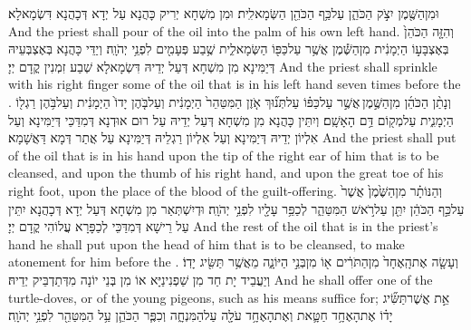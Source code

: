{וּמִן\maqqaf הַשֶּׁ֖מֶן יִצֹ֣ק הַכֹּהֵ֑ן עַל\maqqaf כַּ֥ף הַכֹּהֵ֖ן הַשְּׂמָאלִֽית׃}
{וּמִן מִשְׁחָא יְרִיק כָּהֲנָא עַל יְדָא דְּכָהֲנָא דִּשְׂמָאלָא׃}
{And the priest shall pour of the oil into the palm of his own left hand.}{}
{וְהִזָּ֤ה הַכֹּהֵן֙ בְּאֶצְבָּע֣וֹ הַיְמָנִ֔ית מִן\maqqaf הַשֶּׁ֕מֶן אֲשֶׁ֥ר עַל\maqqaf כַּפּ֖וֹ הַשְּׂמָאלִ֑ית שֶׁ֥בַע פְּעָמִ֖ים לִפְנֵ֥י יְהֹוָֽה׃}
{וְיַדֵּי כָּהֲנָא בְּאֶצְבְּעֵיהּ דְּיַמִּינָא מִן מִשְׁחָא דְּעַל יְדֵיהּ דִּשְׂמָאלָא שְׁבַע זִמְנִין קֳדָם יְיָ׃}
{And the priest shall sprinkle with his right finger some of the oil that is in his left hand seven times before the \lord.}{}
{וְנָתַ֨ן הַכֹּהֵ֜ן מִן\maqqaf הַשֶּׁ֣מֶן \legarmeh  אֲשֶׁ֣ר עַל\maqqaf כַּפּ֗וֹ עַל\maqqaf תְּנ֞וּךְ אֹ֤זֶן הַמִּטַּהֵר֙ הַיְמָנִ֔ית וְעַל\maqqaf בֹּ֤הֶן יָדוֹ֙ הַיְמָנִ֔ית וְעַל\maqqaf בֹּ֥הֶן רַגְל֖וֹ הַיְמָנִ֑ית עַל\maqqaf מְק֖וֹם דַּ֥ם הָאָשָֽׁם׃}
{וְיִתֵּין כָּהֲנָא מִן מִשְׁחָא דְּעַל יְדֵיהּ עַל רוּם אוּדְנָא דְּמִדַּכֵּי דְּיַמִּינָא וְעַל אִלְיוֹן יְדֵיהּ דְּיַמִּינָא וְעַל אִלְיוֹן רַגְלֵיהּ דְּיַמִּינָא עַל אֲתַר דְּמָא דַּאֲשָׁמָא׃}
{And the priest shall put of the oil that is in his hand upon the tip of the right ear of him that is to be cleansed, and upon the thumb of his right hand, and upon the great toe of his right foot, upon the place of the blood of the guilt-offering.}{}
{וְהַנּוֹתָ֗ר מִן\maqqaf הַשֶּׁ֙מֶן֙ אֲשֶׁר֙ עַל\maqqaf כַּ֣ף הַכֹּהֵ֔ן יִתֵּ֖ן עַל\maqqaf רֹ֣אשׁ הַמִּטַּהֵ֑ר לְכַפֵּ֥ר עָלָ֖יו לִפְנֵ֥י יְהֹוָֽה׃}
{וּדְיִשְׁתְּאַר מִן מִשְׁחָא דְּעַל יְדָא דְּכָהֲנָא יִתֵּין עַל רֵישָׁא דְּמִדַּכֵּי לְכַפָּרָא עֲלוֹהִי קֳדָם יְיָ׃}
{And the rest of the oil that is in the priest’s hand he shall put upon the head of him that is to be cleansed, to make atonement for him before the \lord.}{}
{וְעָשָׂ֤ה אֶת\maqqaf הָֽאֶחָד֙ מִן\maqqaf הַתֹּרִ֔ים א֖וֹ מִן\maqqaf בְּנֵ֣י הַיּוֹנָ֑ה מֵאֲשֶׁ֥ר תַּשִּׂ֖יג יָדֽוֹ׃}
{וְיַעֲבֵיד יָת חַד מִן שַׁפְנִינַיָּא אוֹ מִן בְּנֵי יוֹנָה מִדְּתַדְבֵּיק יְדֵיהּ׃}
{And he shall offer one of the turtle-doves, or of the young pigeons, such as his means suffice for;}{}
{אֵ֣ת אֲשֶׁר\maqqaf תַּשִּׂ֞יג יָד֗וֹ אֶת\maqqaf הָאֶחָ֥ד חַטָּ֛את וְאֶת\maqqaf הָאֶחָ֥ד עֹלָ֖ה עַל\maqqaf הַמִּנְחָ֑ה וְכִפֶּ֧ר הַכֹּהֵ֛ן עַ֥ל הַמִּטַּהֵ֖ר לִפְנֵ֥י יְהֹוָֽה׃}
